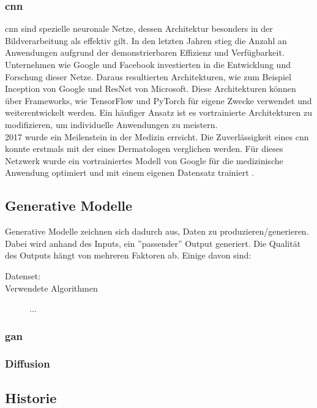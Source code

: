 \documentclass[12pt,a4paper]{article}
\begin{document}
	\subsubsection*{\ac{cnn}} %
	\ac{cnn} sind spezielle neuronale Netze, dessen Architektur besonders in der Bildverarbeitung als effektiv gilt.
	In den letzten Jahren stieg die Anzahl an Anwendungen aufgrund der demonstrierbaren Effizienz und Verfügbarkeit. 
	Unternehmen wie Google und Facebook investierten in die Entwicklung und Forschung dieser Netze.
	Daraus resultierten Architekturen, wie zum Beispiel Inception von Google und ResNet von Microsoft.
	Diese Architekturen können über Frameworks, wie TensorFlow und PyTorch für eigene Zwecke verwendet und weiterentwickelt werden.
	Ein häufiger Ansatz ist es vortrainierte Architekturen zu modifizieren, um individuelle Anwendungen zu meistern.\\
	2017 wurde ein Meilenstein in der Medizin erreicht.
	Die Zuverlässigkeit eines \ac{cnn} konnte erstmals mit der eines Dermatologen verglichen werden.
	Für dieses Netzwerk wurde ein vortrainiertes Modell von Google für die medizinische Anwendung optimiert und mit einem eigenen Datensatz trainiert \cite[\ac{vgl}][]{10.1111/bjd.18880}.

\subsection{Generative Modelle}
	Generative Modelle zeichnen sich dadurch aus, Daten zu produzieren/generieren.
	Dabei wird anhand des Inputs, ein ''passender'' Output generiert.
	Die Qualität des Outputs hängt von mehreren Faktoren ab.
	Einige davon sind: %
	\begin{description}
		\item[Datenset:]
		\item[Verwendete Algorithmen]  
		\item[] ...
	\end{description}

\subsubsection{\ac{gan}}

\subsubsection{Diffusion}

\subsection{Historie}
\end{document}
